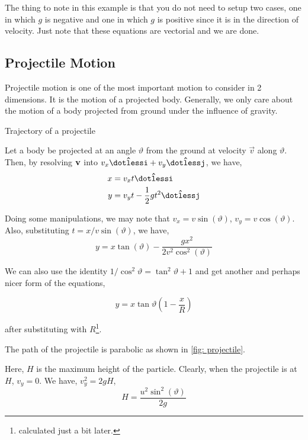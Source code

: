 The thing to note in this example is that you do not need to setup two cases, one in which
\(g\) is negative and one in which \(g\) is positive since it is in the direction of velocity. 
Just note that these equations are vectorial and we are done.


\subsection{Projectile Motion}

Projectile motion is one of the most important motion to consider in 
2 dimensions. It is the motion of a projected body. Generally, we
only care about the motion of a body projected from ground under the influence
of gravity. 

\begin{marginfigure}
    \centering
    \caption{Trajectory of a projectile}
    \label{fig: projectile}
\end{marginfigure}

Let a body be projected at an angle \(\vartheta\) from the ground at velocity \(\vec{v}\)
along \(\vartheta\). Then, by resolving \(\boldsymbol{\mathbf{v}}\) into \(v_x \ihat + v_y\jhat\),
we have, 
\begin{align*}
    x &= v_xt \ihat \\
    y &= v_yt - \frac{1}{2}gt^2 \jhat
\end{align*}

Doing some manipulations, we may note that \(v_x = v\sin(\vartheta)\), \(v_y = v\cos(\vartheta)\).
Also, substituting \(t = x/v\sin(\vartheta)\), we have,
\begin{equation}
    \boxed{y = x\tan(\vartheta) - \frac{gx^2}{2v^2\cos^2(\vartheta)}}
\end{equation}

We can also use the identity \(1/\cos^2\vartheta = \tan^2\vartheta + 1\) and get another and 
perhaps nicer form of the equations,

\begin{equation}
    \boxed{y = x\tan\vartheta\left(1 - \frac{x}{R}\right)}
\end{equation}

after substituting with \(R\)\footnote{calculated just a bit later.}.

The path of the projectile is parabolic as shown in \cref{fig: projectile}.

Here, \(H\) is the maximum height of the particle. Clearly,
when the projectile is at \(H\), \(v_y = 0\). We have, 
\(v_y^2 = 2gH\),
\begin{equation}
    H = \frac{u^2\sin^2(\vartheta)}{2g}
\end{equation}

